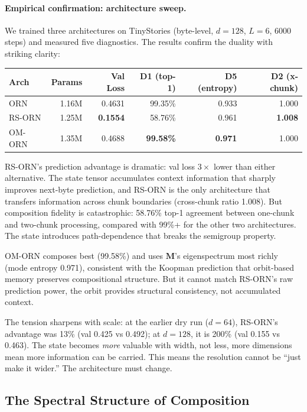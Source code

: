 \documentclass[11pt, a4paper]{article}
\newcommand{\M}{\mathbf{M}}
\theoremstyle{plain}
\theoremstyle{remark}
\begin{document}
\paragraph{Empirical confirmation: architecture sweep.}
We trained three architectures on TinyStories (byte-level, $d{=}128$, $L{=}6$, 6000 steps) and measured five diagnostics.
The results confirm the duality with striking clarity:

\begin{center}\small
\begin{tabular}{@{}lrrrrr@{}}
\toprule
\textbf{Arch} & \textbf{Params} & \textbf{Val Loss} & \textbf{D1 (top-1)} & \textbf{D5 (entropy)} & \textbf{D2 (x-chunk)} \\
\midrule
ORN      & 1.16M & 0.4631 & 99.35\% & 0.933 & 1.000 \\
RS-ORN   & 1.25M & \textbf{0.1554} & 58.76\% & 0.961 & \textbf{1.008} \\
OM-ORN   & 1.35M & 0.4688 & \textbf{99.58\%} & \textbf{0.971} & 1.000 \\
\bottomrule
\end{tabular}
\end{center}

RS-ORN's prediction advantage is dramatic: val loss $3{\times}$ lower than either alternative.
The state tensor accumulates context information that sharply improves next-byte prediction, and RS-ORN is the only architecture that transfers information across chunk boundaries (cross-chunk ratio 1.008).
But composition fidelity is catastrophic: 58.76\% top-1 agreement between one-chunk and two-chunk processing, compared with 99\%+ for the other two architectures.
The state introduces path-dependence that breaks the semigroup property.

OM-ORN composes best (99.58\%) and uses $\M$'s eigenspectrum most richly (mode entropy 0.971), consistent with the Koopman prediction that orbit-based memory preserves compositional structure.
But it cannot match RS-ORN's raw prediction power, the orbit provides structural consistency, not accumulated context.

The tension sharpens with scale: at the earlier dry run ($d{=}64$), RS-ORN's advantage was 13\% (val 0.425 vs 0.492); at $d{=}128$, it is 200\% (val 0.155 vs 0.463).
The state becomes \emph{more} valuable with width, not less, more dimensions mean more information can be carried.
This means the resolution cannot be ``just make it wider.''
The architecture must change.

\subsection{The Spectral Structure of Composition}
\end{document}
